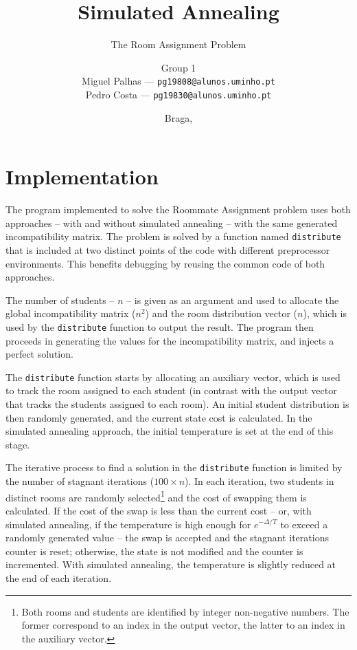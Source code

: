 \documentclass[abstract=on,9pt,twocolumn]{scrartcl}
\title{Simulated Annealing}
\subtitle{The Room Assignment Problem}
\author{{\larger Group 1}\\Miguel Palhas \hfill--- \texttt{\smaller pg19808@alunos.uminho.pt}\\Pedro Costa \hfill--- \texttt{\smaller pg19830@alunos.uminho.pt}\\}
\date{Braga, \docdate}
\begin{document}
\maketitle




\section{Implementation}
The program implemented to solve the Roommate Assignment problem uses both approaches -- with and without simulated annealing -- with the same generated incompatibility matrix. The problem is solved by a function named \texttt{distribute} that is included at two distinct points of the code with different preprocessor environments. This benefits debugging by reusing the common code of both approaches.

The number of students -- $n$ -- is given as an argument and used to allocate the global incompatibility matrix ($n^{2}$) and the room distribution vector ($n$), which is used by the \texttt{distribute} function to output the result. The program then proceeds in generating the values for the incompatibility matrix, and injects a perfect solution.

The \texttt{distribute} function starts by allocating an auxiliary vector, which is used to track the room assigned to each student (in contrast with the output vector that tracks the students assigned to each room). An initial student distribution is then randomly generated, and the current state cost is calculated. In the simulated annealing approach, the initial temperature is set at the end of this stage.

The iterative process to find a solution in the \texttt{distribute} function is limited by the number of stagnant iterations ($100\times n$). In each iteration, two students in distinct rooms are randomly selected\footnote{Both rooms and students are identified by integer non-negative numbers. The former correspond to an index in the output vector, the latter to an index in the auxiliary vector.} and the cost of swapping them is calculated. If the cost of the swap is less than the current cost -- or, with simulated annealing, if the temperature is high enough for $e^{-\Delta/T}$ to exceed a randomly generated value -- the swap is accepted and the stagnant iterations counter is reset; otherwise, the state is not modified and the counter is incremented. With simulated annealing, the temperature is slightly reduced at the end of each iteration.
\end{document}
